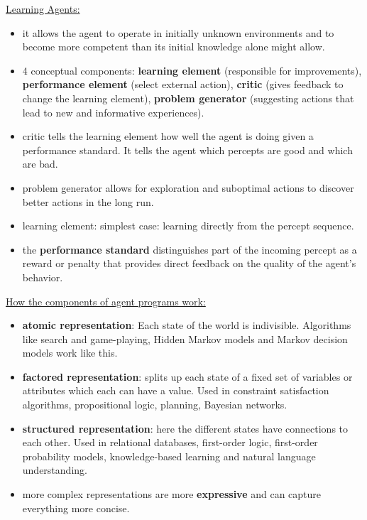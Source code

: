 \underline{Learning Agents:}
\begin{itemize}[noitemsep,nolistsep]
	\item it allows the agent to operate in initially unknown environments and to become more competent than its initial knowledge alone might allow.
	\item 4 conceptual components: \textbf{learning element} (responsible for improvements), \textbf{performance element} (select external action), \textbf{critic} (gives feedback to change the learning element), \textbf{problem generator} (suggesting actions that lead to new and informative experiences).
	\item critic tells the learning element how well the agent is doing given a performance standard. It tells the agent which percepts are good and which are bad.
	\item problem generator allows for exploration and suboptimal actions to discover better actions in the long run.
	\item learning element: simplest case: learning directly from the percept sequence.
	\item the \textbf{performance standard} distinguishes part of the incoming percept as a reward or penalty that provides direct feedback on the quality of the agent’s behavior.
\end{itemize}

\underline{How the components of agent programs work:}
\begin{itemize}[noitemsep,nolistsep]
	\item \textbf{atomic representation}: Each state of the world is indivisible. Algorithms like search and game-playing, Hidden Markov models and Markov decision models work like this.
	\item \textbf{factored representation}: splits up each state of a fixed set of variables or attributes which each can have a value. Used in constraint satisfaction algorithms, propositional logic, planning, Bayesian networks.
	\item \textbf{structured representation}: here the different states have connections to each other. Used in relational databases, first-order logic, first-order probability models, knowledge-based learning and natural language understanding.
	\item more complex representations are more \textbf{expressive} and can capture everything more concise.
\end{itemize}

